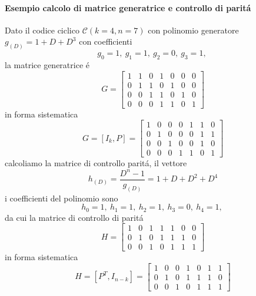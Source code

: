             \paragraph{Esempio calcolo di matrice generatrice e controllo di paritá}
                Dato il codice ciclico $\mathcal{C}(k=4,n=7)$ con polinomio generatore $g_{(D)} = 1+D+D^3$
                con coefficienti
                \[
                    g_0=1,\ g_1=1,\ g_2=0,\ g_3=1,\
                \]
                la matrice generatrice é
                \[
                    G = 
                    \begin{bmatrix}
                    1 & 1 & 0 & 1 & 0 & 0 & 0\\ 
                    0 & 1 & 1 & 0 & 1 & 0 & 0\\ 
                    0 & 0 & 1 & 1 & 0 & 1 & 0\\ 
                    0 & 0 & 0 & 1 & 1 & 0 & 1
                    \end{bmatrix}
                \] 
                in forma sistematica\[
                    G = [I_k,P] =
                    \begin{bmatrix}
                    1 & 0 & 0 & 0 & 1 & 1 & 0\\ 
                    0 & 1 & 0 & 0 & 0 & 1 & 1\\ 
                    0 & 0 & 1 & 0 & 0 & 1 & 0\\ 
                    0 & 0 & 0 & 1 & 1 & 0 & 1
                    \end{bmatrix}
                \] 
                calcoliamo la matrice di controllo paritá, il vettore 
                \[
                    h_{(D)} = \frac{D^n-1}{g_{(D)}} = 1+D+D^2+D^4
                \]
                i coefficienti del polinomio sono 
                \[
                    h_0=1,\ h_1=1,\ h_2=1,\ h_3=0,\ h_4=1,\
                \]
                da cui la matrice di controllo di paritá
                \[
                    H = 
                    \begin{bmatrix}
                    1 & 0 & 1 & 1 & 1 & 0 & 0\\ 
                    0 & 1 & 0 & 1 & 1 & 1 & 0\\ 
                    0 & 0 & 1 & 0 & 1 & 1 & 1
                    \end{bmatrix}
                \]
                in forma sistematica
                \[
                    H =[P^T,I_{n-k}]= 
                    \begin{bmatrix}
                    1 & 0 & 0 & 1 & 0 & 1 & 1\\ 
                    0 & 1 & 0 & 1 & 1 & 1 & 0\\ 
                    0 & 0 & 1 & 0 & 1 & 1 & 1
                    \end{bmatrix}
                \]
